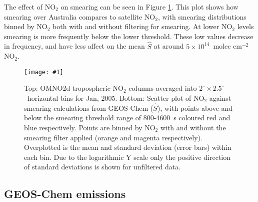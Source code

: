 \documentclass[acp, manuscript]{copernicus}
\newcommand{\textcite}{\citet}
\newcommand{\lowhr}{$2^{\circ} \times 2.5^{\circ}$}
\newcommand{\mypic}[3]{%
  \begin{figure}
    \texttt{[image: \#1]}
    \caption{#2}
    #3
  \end{figure}
}
\begin{document}
        The effect of NO$_2$ on smearing can be seen in Figure \ref{BiogIsop:Method:smearing:fig_smearing_vs_nox}.
        This plot shows how smearing over Australia compares to satellite NO$_2$, with smearing distributions binned by NO$_2$ both with and without filtering for smearing.
        At lower NO$_2$ levels smearing is more frequently below the lower threshold. 
        These low values decrease in frequency, and have less affect on the mean $\hat{S}$ at around $5 \times 10^{14} $~molec cm$^{-2}$ NO$_2$.
        
        \mypic{Figures/Filters/smearing_nox_200501.png}{%
          Top: OMNO2d tropospheric NO$_2$ columns averaged into \lowhr ~horizontal bins for Jan, 2005.
          Bottom: Scatter plot of NO$_2$ against smearing calculations from GEOS-Chem ($\hat{S}$), with points above and below the smearing threshold range of 800-4600~s coloured red and blue respectively. 
          Points are binned by NO$_2$ with and without the smearing filter applied (orange and magenta respectively).
          Overplotted is the mean and standard deviation (error bars) within each bin. 
          Due to the logarithmic Y scale only the positive direction of standard deviations is shown for unfiltered data.
        }{\label{BiogIsop:Method:smearing:fig_smearing_vs_nox}}
  
  \subsection{GEOS-Chem emissions}
    
\end{document}
